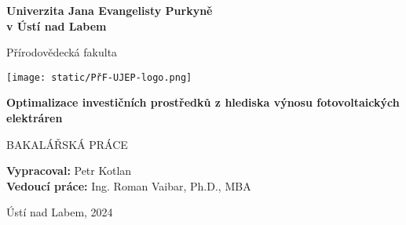 \begin{titlepage}
    \begin{center}
        \vspace*{1cm}
            
        \Huge
        \textbf{\textsf{Univerzita Jana Evangelisty Purkyně \\v Ústí nad Labem}}
            
        \vspace{0.5cm}
        \LARGE
        Přírodovědecká fakulta
        
        \vspace{2cm}
        \texttt{[image: static/PřF-UJEP-logo.png]}
        \vspace{2cm}
            
        \textbf{Optimalizace investičních prostředků z hlediska výnosu fotovoltaických elektráren}
        
        \vspace{1.5cm}

        BAKALÁŘSKÁ PRÁCE

        \vfill

        \begin{flushleft}
            \textbf{Vypracoval:} Petr Kotlan \\
            \textbf{Vedoucí práce:} Ing. Roman Vaibar, Ph.D., MBA
            
        \end{flushleft}

        \vspace{1.5cm}

        Ústí nad Labem, 2024

    \end{center}
\end{titlepage}
